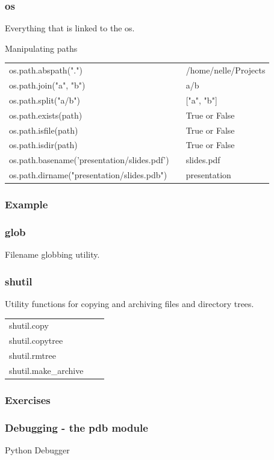 \documentclass[xcolor=dvipsnames]{beamer}
\begin{document}
\begin{frame}
\frametitle{os}
Everything that is linked to the os.
\begin{block}{Manipulating paths}
\begin{tabular}{lll}
os.path.abspath(".") & & /home/nelle/Projects \\
os.path.join("a", "b") & & a/b \\
os.path.split("a/b") & & ["a", "b"] \\
os.path.exists(path) & & True or False \\
os.path.isfile(path) & & True or False \\
os.path.isdir(path) & & True or False \\
os.path.basename('presentation/slides.pdf') & & slides.pdf \\
os.path.dirname("presentation/slides.pdb") & & presentation \\
\end{tabular}
\end{block}

\end{frame}
\begin{frame}
\frametitle{Example}

\end{frame}

\begin{frame}
\frametitle{glob}
\begin{block}{Filename globbing utility.}

\end{block}
\end{frame}

\begin{frame}
\frametitle{shutil}

\begin{block}{Utility functions for copying and archiving files and directory
trees.}
\begin{tabular}{lll}
shutil.copy & & \\
shutil.copytree & & \\
shutil.rmtree & & \\
shutil.make\_archive & & \\
\end{tabular}
\end{block}
\end{frame}

\begin{frame}
\frametitle{Exercises}
\end{frame}

\begin{frame}
\frametitle{Debugging - the pdb module}
\begin{block}{Python Debugger}

\end{block}
\end{frame}
\end{document}
